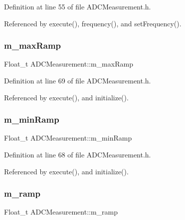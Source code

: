 Definition at line 55 of file A\+D\+C\+Measurement.\+h.



Referenced by execute(), frequency(), and set\+Frequency().

\mbox{\label{classADCMeasurement_a5e1f799c05f5781004a9081c4064e4a8}} 
\subsubsection{\texorpdfstring{m\+\_\+max\+Ramp}{m\_maxRamp}}
{\footnotesize\ttfamily Float\+\_\+t A\+D\+C\+Measurement\+::m\+\_\+max\+Ramp\hspace{0.3cm}{\ttfamily [private]}}



Definition at line 69 of file A\+D\+C\+Measurement.\+h.



Referenced by execute(), and initialize().

\mbox{\label{classADCMeasurement_ab015017d6a05ac4711836ceb1e072a85}} 
\subsubsection{\texorpdfstring{m\+\_\+min\+Ramp}{m\_minRamp}}
{\footnotesize\ttfamily Float\+\_\+t A\+D\+C\+Measurement\+::m\+\_\+min\+Ramp\hspace{0.3cm}{\ttfamily [private]}}



Definition at line 68 of file A\+D\+C\+Measurement.\+h.



Referenced by execute(), and initialize().

\mbox{\label{classADCMeasurement_ac84ed2ba70f38e73ec0eec1de65bbdca}} 
\subsubsection{\texorpdfstring{m\+\_\+ramp}{m\_ramp}}
{\footnotesize\ttfamily Float\+\_\+t A\+D\+C\+Measurement\+::m\+\_\+ramp\hspace{0.3cm}{\ttfamily [private]}}



